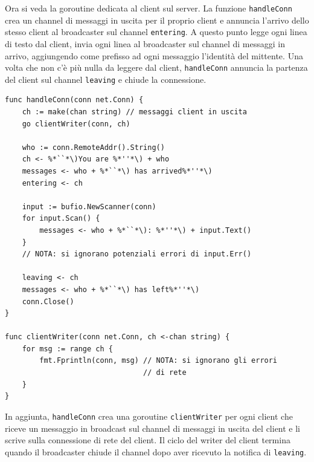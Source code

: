 Ora si veda la goroutine dedicata al client sul server.
La funzione \verb|handleConn| crea un channel di messaggi in uscita per il proprio client e annuncia l'arrivo dello stesso client al broadcaster sul channel \verb|entering|.
A questo punto legge ogni linea di testo dal client, invia ogni linea al broadcaster sul channel di messaggi in arrivo, aggiungendo come prefisso ad ogni messaggio l'identità del mittente.
Una volta che non c'è più nulla da leggere dal client, \verb|handleConn| annuncia la partenza del client sul channel \verb|leaving| e chiude la connessione.
\begin{lstlisting}[frame=single, label={lst:lstlisting7-10.3}]
func handleConn(conn net.Conn) {
    ch := make(chan string) // messaggi client in uscita
    go clientWriter(conn, ch)

    who := conn.RemoteAddr().String()
    ch <- %*``*\)You are %*''*\) + who
    messages <- who + %*``*\) has arrived%*''*\)
    entering <- ch

    input := bufio.NewScanner(conn)
    for input.Scan() {
        messages <- who + %*``*\): %*''*\) + input.Text()
    }
    // NOTA: si ignorano potenziali errori di input.Err()

    leaving <- ch
    messages <- who + %*``*\) has left%*''*\)
    conn.Close()
}

func clientWriter(conn net.Conn, ch <-chan string) {
    for msg := range ch {
        fmt.Fprintln(conn, msg) // NOTA: si ignorano gli errori
                                // di rete
    }
}
\end{lstlisting}
In aggiunta, \verb|handleConn| crea una goroutine \verb|clientWriter| per ogni client che riceve un messaggio in broadcast sul channel di messaggi in uscita del client e li scrive sulla connessione di rete del client.
Il ciclo del writer del client termina quando il broadcaster chiude il channel dopo aver ricevuto la notifica di \verb|leaving|.

